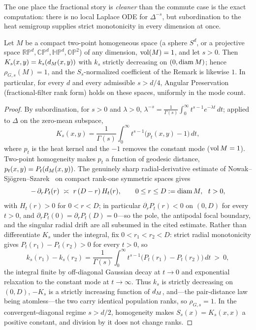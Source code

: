 The one place the fractional story is \emph{cleaner} than the commute case is the exact
computation: there is no local Laplace ODE for $\Delta^{-s}$, but subordination to the heat
semigroup supplies strict monotonicity in every dimension at once.

\begin{theorem}[Fractional Green-rank $=1$ on rank-one symmetric spaces]\label{thm:twopoint}
Let $M$ be a compact two-point homogeneous space (a sphere $S^d$, or a projective space
$\mathbb{RP}^d,\mathbb{CP}^d,\mathbb{HP}^d,\mathbb{OP}^2$) of any dimension, $\operatorname{vol}(M)=1$, and
let $s>0$. Then $K_s(x,y)=k_s(d_M(x,y))$ with $k_s$ strictly decreasing on
$(0,\operatorname{diam} M)$; hence $\rho_{G,s}(M)=1$, and the $S_s$-normalized coefficient of the Remark
is likewise $1$. In particular, for every $d$ and every admissible $s>d/4$, Angular
Preservation (fractional-filter rank form) holds on these spaces, uniformly in the mode
count.
\end{theorem}

\begin{proof}
By subordination, for $s>0$ and $\lambda>0$, $\lambda^{-s}=\frac1{\Gamma(s)}\int_0^\infty
t^{s-1}e^{-\lambda t}\,dt$; applied to $\Delta$ on the zero-mean subspace,
\[
K_s(x,y)=\frac1{\Gamma(s)}\int_0^\infty t^{s-1}\bigl(p_t(x,y)-1\bigr)\,dt,
\]
where $p_t$ is the heat kernel and the $-1$ removes the constant mode ($\operatorname{vol} M=1$). Two-point
homogeneity makes $p_t$ a function of geodesic distance, $p_t(x,y)=P_t(d_M(x,y))$. The
genuinely sharp radial-derivative estimate of Nowak--Sj\"ogren--Szarek~\cite{nss} on compact
rank-one symmetric spaces gives
\[
-\,\partial_r P_t(r)\ \asymp\ r\,(D-r)\,H_t(r),\qquad 0\le r\le D:=\diam M,\ \ t>0,
\]
with $H_t(r)>0$ for $0<r<D$; in particular $\partial_r P_t(r)<0$ on $(0,D)$ for every $t>0$,
and $\partial_r P_t(0)=\partial_r P_t(D)=0$---so the pole, the antipodal focal boundary, and
the singular radial drift are all subsumed in the cited estimate. Rather than differentiate
$K_s$ under the integral, fix $0<r_1<r_2<D$: strict radial monotonicity gives
$P_t(r_1)-P_t(r_2)>0$ for every $t>0$, so
\[
k_s(r_1)-k_s(r_2)=\frac1{\Gamma(s)}\int_0^\infty t^{s-1}\bigl(P_t(r_1)-P_t(r_2)\bigr)\,dt\ >\ 0,
\]
the integral finite by off-diagonal Gaussian decay at $t\to0$ and exponential relaxation to
the constant mode at $t\to\infty$. Thus $k_s$ is strictly decreasing on $(0,D)$, $-K_s$ is a
strictly increasing function of $d_M$, and---the pair-distance law being atomless---the two
carry identical population ranks, so $\rho_{G,s}=1$. In the convergent-diagonal regime
$s>d/2$, homogeneity makes $S_s(x)=K_s(x,x)$ a positive constant, and division by it does not
change ranks.
\end{proof}

